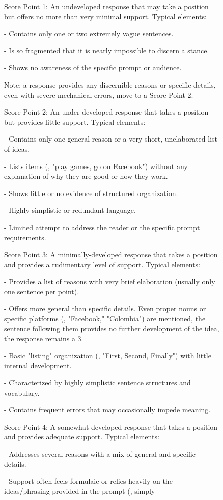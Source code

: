 \begin{figure}[t]
\begin{tcolorbox}[colback=white,colframe=black!25,title=Refined Rubric (Pattern-Highlighted),fonttitle=\bfseries\small,fontupper=\scriptsize]
Score Point 1: An undeveloped response that may take a position but offers no more than very minimal support. Typical elements:\par - Contains only one or two extremely vague sentences.\par - Is so fragmented that it is nearly impossible to discern a stance.\par - Shows no awareness of the specific prompt or audience.\par Note:  a response provides any discernible reasons or specific details, even with severe mechanical errors, move to  a Score Point 2.\par \par Score Point 2: An under-developed response that takes a position but provides little support. Typical elements:\par - Contains only one general reason or a very short, unelaborated list of ideas.\par - Lists items (, "play games, go on Facebook") without any explanation of why they are good or how they work.\par - Shows little or no evidence of structured organization.\par - Highly simplistic or redundant language.\par - Limited attempt to address the reader or the specific prompt requirements.\par \par Score Point 3: A minimally-developed response that takes a position and provides a rudimentary level of support. Typical elements:\par - Provides a list of reasons with very brief elaboration (usually only one sentence per point).\par - Offers more general than specific details. Even  proper nouns or specific platforms (, "Facebook," "Colombia") are mentioned,  the sentence following them provides no further development of the idea, the response remains a 3.\par - Basic "listing" organization (, "First, Second, Finally") with little internal development.\par - Characterized by highly simplistic sentence structures and vocabulary.\par - Contains frequent errors that may occasionally impede meaning.\par \par Score Point 4: A somewhat-developed response that takes a position and provides adequate support. Typical elements:\par - Addresses several reasons with a mix of general and specific details.\par - Support often feels formulaic or relies heavily on the ideas/phrasing provided in the prompt (, simply 
\end{tcolorbox}
\end{figure}
